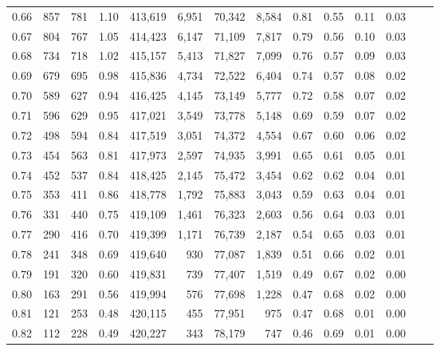 \begin{tabular}{rrrrrrrrrrrrrr}
0.66 &     857 &    781 &    1.10 &  413,619 &    6,951 &  70,342 &   8,584 &  0.81 &  0.55 &  0.11 &      0.03 \\
0.67 &     804 &    767 &    1.05 &  414,423 &    6,147 &  71,109 &   7,817 &  0.79 &  0.56 &  0.10 &      0.03 \\
0.68 &     734 &    718 &    1.02 &  415,157 &    5,413 &  71,827 &   7,099 &  0.76 &  0.57 &  0.09 &      0.03 \\
0.69 &     679 &    695 &    0.98 &  415,836 &    4,734 &  72,522 &   6,404 &  0.74 &  0.57 &  0.08 &      0.02 \\
0.70 &     589 &    627 &    0.94 &  416,425 &    4,145 &  73,149 &   5,777 &  0.72 &  0.58 &  0.07 &      0.02 \\
0.71 &     596 &    629 &    0.95 &  417,021 &    3,549 &  73,778 &   5,148 &  0.69 &  0.59 &  0.07 &      0.02 \\
0.72 &     498 &    594 &    0.84 &  417,519 &    3,051 &  74,372 &   4,554 &  0.67 &  0.60 &  0.06 &      0.02 \\
0.73 &     454 &    563 &    0.81 &  417,973 &    2,597 &  74,935 &   3,991 &  0.65 &  0.61 &  0.05 &      0.01 \\
0.74 &     452 &    537 &    0.84 &  418,425 &    2,145 &  75,472 &   3,454 &  0.62 &  0.62 &  0.04 &      0.01 \\
0.75 &     353 &    411 &    0.86 &  418,778 &    1,792 &  75,883 &   3,043 &  0.59 &  0.63 &  0.04 &      0.01 \\
0.76 &     331 &    440 &    0.75 &  419,109 &    1,461 &  76,323 &   2,603 &  0.56 &  0.64 &  0.03 &      0.01 \\
0.77 &     290 &    416 &    0.70 &  419,399 &    1,171 &  76,739 &   2,187 &  0.54 &  0.65 &  0.03 &      0.01 \\
0.78 &     241 &    348 &    0.69 &  419,640 &      930 &  77,087 &   1,839 &  0.51 &  0.66 &  0.02 &      0.01 \\
0.79 &     191 &    320 &    0.60 &  419,831 &      739 &  77,407 &   1,519 &  0.49 &  0.67 &  0.02 &      0.00 \\
0.80 &     163 &    291 &    0.56 &  419,994 &      576 &  77,698 &   1,228 &  0.47 &  0.68 &  0.02 &      0.00 \\
0.81 &     121 &    253 &    0.48 &  420,115 &      455 &  77,951 &     975 &  0.47 &  0.68 &  0.01 &      0.00 \\
0.82 &     112 &    228 &    0.49 &  420,227 &      343 &  78,179 &     747 &  0.46 &  0.69 &  0.01 &      0.00 \\

\end{tabular}
